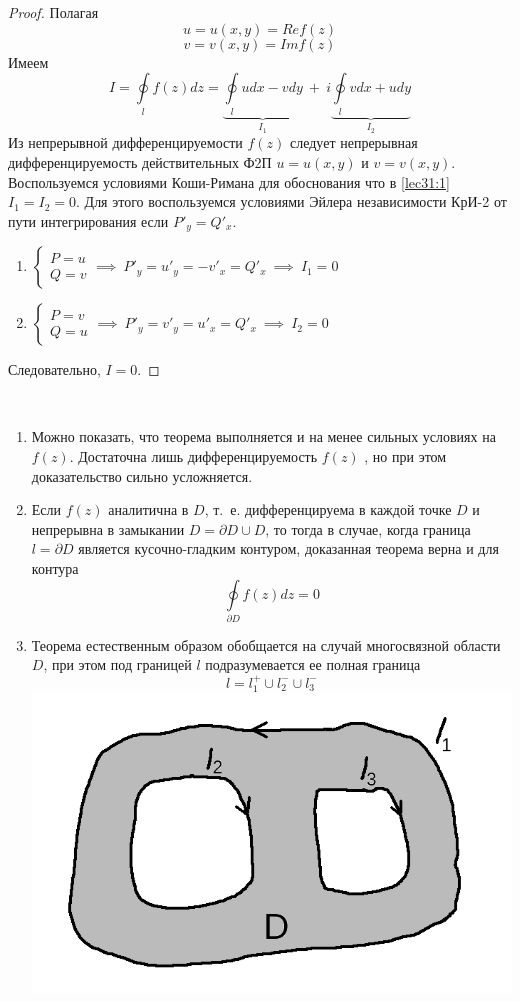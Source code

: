 \documentclass[../../main.tex]{subfiles}
\begin{document}
\begin{proof}
	Полагая
	\[ u = u(x, y) = Re f(z) \]
	\[ v = v(x, y) = Im f(z) \]
	Имеем
	\begin{equation}
		\label{lec31:1}
		 I = \oint\limits_{l} f(z) dz =
		\underbrace{ \oint\limits_{l} u dx - v dy }_{I_1}
		\ + \ i \underbrace{ \oint\limits_{l} v dx + u dy }_{I_2}
	\end{equation}
	Из непрерывной дифференцируемости $f(z)$ следует непрерывная
	дифференцируемость действительных Ф2П $u = u(x, y)$ и $ v = v(x, y)$.
	Воспользуемся условиями Коши-Римана для обоснования что в
	\eqref{lec31:1} $I_1 = I_2 = 0$. Для этого воспользуемся условиями
	Эйлера независимости КрИ-2 от пути интегрирования если
	$P'_y = Q'_x $.
	\begin{enumerate}
		\item $\begin{cases}
				P = u \\
				Q = v
			\end{cases} \implies \ P'_y = u'_y = -v'_x = Q'_x
			\ \implies \ I_1 = 0 $
		\item $\begin{cases}
			P = v \\
			Q = u
		\end{cases} \implies \ P'_y = v'_y = u'_x = Q'_x
		\ \implies \ I_2 = 0 $
	\end{enumerate}
	Следовательно, $I = 0$.
\end{proof}
\begin{rems}
	\
\end{rems}
\begin{enumerate}
		\item Можно показать, что теорема выполняется и на менее сильных
			условиях на $f(z)$. Достаточна лишь дифференцируемость $f(z)$
			, но при этом доказательство сильно усложняется.
		\item Если $f(z)$ аналитична в $D$, т.~е. дифференцируема в каждой
			точке $D$ и непрерывна в замыкании $D = \partial D \cup D$,
			то тогда в случае, когда граница $ l = \partial D$ является
			кусочно-гладким контуром, доказанная теорема верна и для
			контура
			\[ \oint\limits_{\partial D} f(z) dz = 0 \]
		\item Теорема естественным образом обобщается на случай
			многосвязной области $D$, при этом под границей $l$
			подразумевается ее полная граница
			\[ l = l_1^+ \cup l_2^- \cup l_3^- \]
			\includegraphics[scale = 0.3]{lec31_1.png}
\end{enumerate}
\end{document}

